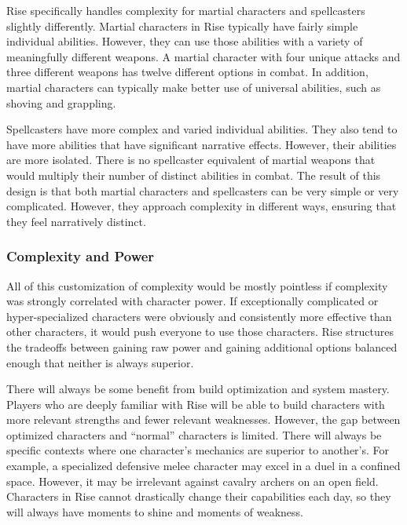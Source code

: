       Rise specifically handles complexity for martial characters and spellcasters slightly differently.
      Martial characters in Rise typically have fairly simple individual abilities.
      However, they can use those abilities with a variety of meaningfully different weapons.
      A martial character with four unique attacks and three different weapons has twelve different options in combat.
      In addition, martial characters can typically make better use of universal abilities, such as shoving and grappling.

      Spellcasters have more complex and varied individual abilities.
      They also tend to have more abilities that have significant narrative effects.
      However, their abilities are more isolated.
      There is no spellcaster equivalent of martial weapons that would multiply their number of distinct abilities in combat.
      The result of this design is that both martial characters and spellcasters can be very simple or very complicated.
      However, they approach complexity in different ways, ensuring that they feel narratively distinct.

    \subsubsection{Complexity and Power}
      All of this customization of complexity would be mostly pointless if complexity was strongly correlated with character power.
      If exceptionally complicated or hyper-specialized characters were obviously and consistently more effective than other characters, it would push everyone to use those characters.
      Rise structures the tradeoffs between gaining raw power and gaining additional options balanced enough that neither is always superior.

      There will always be some benefit from build optimization and system mastery.
      Players who are deeply familiar with Rise will be able to build characters with more relevant strengths and fewer relevant weaknesses.
      However, the gap between optimized characters and ``normal'' characters is limited.
      There will always be specific contexts where one character's mechanics are superior to another's.
      For example, a specialized defensive melee character may excel in a duel in a confined space.
      However, it may be irrelevant against cavalry archers on an open field.
      Characters in Rise cannot drastically change their capabilities each day, so they will always have moments to shine and moments of weakness.

